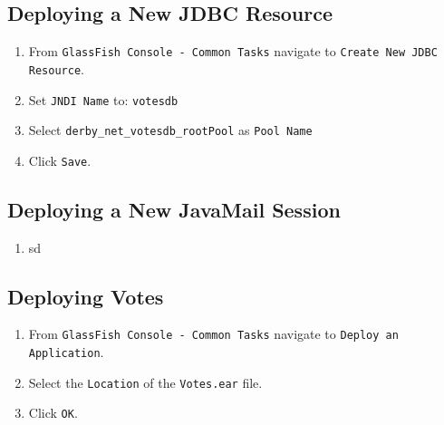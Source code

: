\subsection{Deploying a New JDBC Resource}

\begin{enumerate}

\item
From \texttt{GlassFish Console - Common Tasks} navigate to \texttt{Create New JDBC Resource}.

\item
Set \texttt{JNDI Name} to: \texttt{votesdb}

\item
Select \texttt{derby\_net\_votesdb\_rootPool} as \texttt{Pool Name}

\item
Click \texttt{Save}.

\end{enumerate}


\subsection{Deploying a New JavaMail Session}

\begin{enumerate}

\item
sd

\end{enumerate}

\subsection{Deploying Votes}

\begin{enumerate}

\item
From \texttt{GlassFish Console - Common Tasks} navigate to \texttt{Deploy an Application}.

\item
Select the \texttt{Location} of the \texttt{Votes.ear} file.

\item
Click \texttt{OK}.

\end{enumerate}